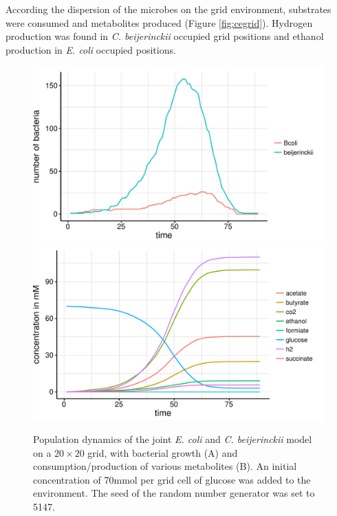 According the dispersion of the microbes on the grid environment, substrates were consumed and metabolites produced (Figure \hyperref[fig:cegrid]{\ref{fig:cegrid}}). Hydrogen production was found in \textit{C. beijerinckii} occupied grid positions and ethanol production in \textit{E. coli} occupied positions.
\begin{figure}[h!]
  \centering
    \includegraphics[scale=0.45]{../results/ecoli_beijerinckii_20x20_seed5147_growth.pdf}
    \includegraphics[scale=0.45]{../results/ecoli_beijerinckii_20x20_seed5147_subs.pdf}
  \caption{Population dynamics of the joint \emph{E. coli} and \emph{C. beijerinckii} model on a $20\times20$ grid, with bacterial growth (A) and consumption/production of various metabolites (B). An initial concentration of 70\;mmol per grid cell of glucose was added to the environment. The seed of the random number generator was set to 5147.}
  \label{fig:cesg}
\end{figure}
